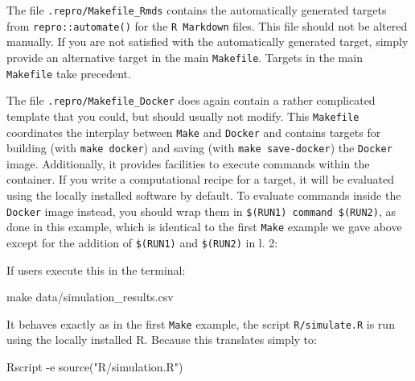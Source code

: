 \documentclass[psych,tutorial,submit,moreauthors,pdftex]{mdpi}
\newenvironment{Shaded}{\begin{snugshade}}{\end{snugshade}}
\newcommand{\AttributeTok}[1]{\textcolor[rgb]{0.77,0.63,0.00}{#1}}
\newcommand{\ExtensionTok}[1]{#1}
\newcommand{\FunctionTok}[1]{\textcolor[rgb]{0.00,0.00,0.00}{#1}}
\newcommand{\NormalTok}[1]{#1}
\newcommand{\StringTok}[1]{\textcolor[rgb]{0.31,0.60,0.02}{#1}}
\newcommand{\VariableTok}[1]{\textcolor[rgb]{0.00,0.00,0.00}{#1}}
\begin{document}
The file \texttt{.repro/Makefile\_Rmds} contains the automatically
generated targets from \texttt{repro::automate()} for the
\texttt{R\ Markdown} files. This file should not be altered manually. If
you are not satisfied with the automatically generated target, simply
provide an alternative target in the main \texttt{Makefile}. Targets in
the main \texttt{Makefile} take precedent.

The file \texttt{.repro/Makefile\_Docker} does again contain a rather
complicated template that you could, but should usually not modify. This
\texttt{Makefile} coordinates the interplay between \texttt{Make} and
\texttt{Docker} and contains targets for building (with
\texttt{make\ docker}) and saving (with \texttt{make\ save-docker}) the
\texttt{Docker} image. Additionally, it provides facilities to execute
commands within the container. If you write a computational recipe for a
target, it will be evaluated using the locally installed software by
default. To evaluate commands inside the \texttt{Docker} image instead,
you should wrap them in \texttt{\$(RUN1)\ command\ \$(RUN2)}, as done in
this example, which is identical to the first \texttt{Make} example we
gave above except for the addition of \texttt{\$(RUN1)} and
\texttt{\$(RUN2)} in l. 2:

\begin{Shaded}
\end{Shaded}

If users execute this in the terminal:

\begin{Shaded}
\begin{Highlighting}[]
\FunctionTok{make}\NormalTok{ data/simulation\_results.csv}
\end{Highlighting}
\end{Shaded}

It behaves exactly as in the first \texttt{Make} example, the script
\texttt{R/simulate.R} is run using the locally installed R. Because this
translates simply to:

\begin{Shaded}
\begin{Highlighting}[]
\ExtensionTok{Rscript} \AttributeTok{{-}e} \StringTok{\textquotesingle{}source("R/simulation.R")\textquotesingle{}}
\end{Highlighting}
\end{Shaded}
\end{document}

